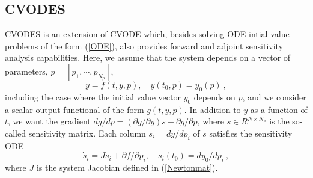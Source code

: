 \subsection{CVODES}\label{ss:cvodes}

CVODES is an extension of CVODE which, besides solving ODE intial
value problems of the form (\ref{ODE}), also provides forward and 
adjoint sensitivity analysis capabilities.
%
Here, we assume that the system depends on a vector of parameters,
$p = [p_1,\cdots,p_{N_p}]$,
\begin{equation}\label{e:ODE_with_p}
\dot{y} = f(t,y,p), \quad y(t_0,p) = y_0(p) ~,
\end{equation}
including the case where the initial value vector $y_0$ depends on $p$,
and we consider a scalar output functional of the form $g(t,y,p)$.
%
In addition to $y$ as a function of $t$, we want the gradient 
$d g / d p  = ({\partial g}/{\partial y}) s + {\partial g}/{\partial p}$, 
where $s \in R^{N \times N_p}$ is the so-called sensitivity matrix.
%
Each column $s_i = d y / d p_i$ of $s$ satisfies the sensitivity ODE
\begin{equation}\label{e:fwdODE}
\dot{s}_i = J s_i + \partial f / \partial p_i, 
\quad s_i(t_0) = d y_0 / d p_i ~,
\end{equation}
where $J$ is the system Jacobian defined in (\ref{Newtonmat}).

